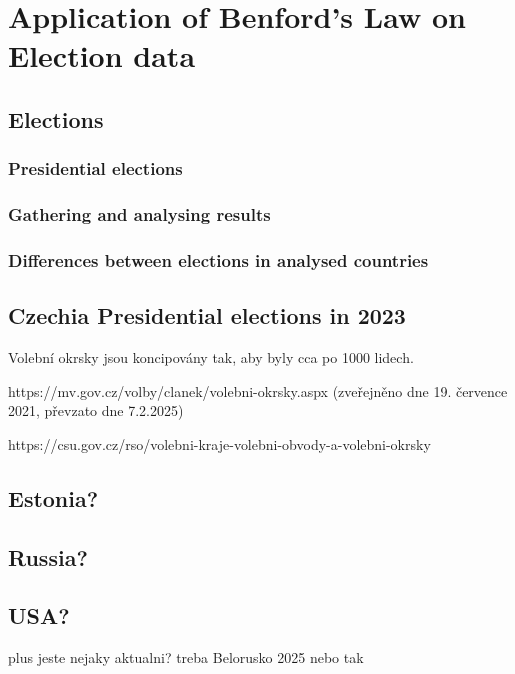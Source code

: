 \chapter{Application of Benford's Law on Election data}


\section{Elections} 

\subsection{Presidential elections}

\subsection{Gathering and analysing results}

\subsection{Differences between elections in analysed countries} 

\section{Czechia Presidential elections in 2023}

\begin{koment}
Volební okrsky jsou koncipovány tak, aby byly cca po 1000 lidech. 

https://mv.gov.cz/volby/clanek/volebni-okrsky.aspx (zveřejněno dne 19. července 2021, převzato dne 7.2.2025) 

https://csu.gov.cz/rso/volebni-kraje-volebni-obvody-a-volebni-okrsky 
\end{koment}


\section{Estonia?}

\section{Russia?}

\section{USA?}

\begin{koment}
plus jeste nejaky aktualni? treba Belorusko 2025 nebo tak 
\end{koment}
    




